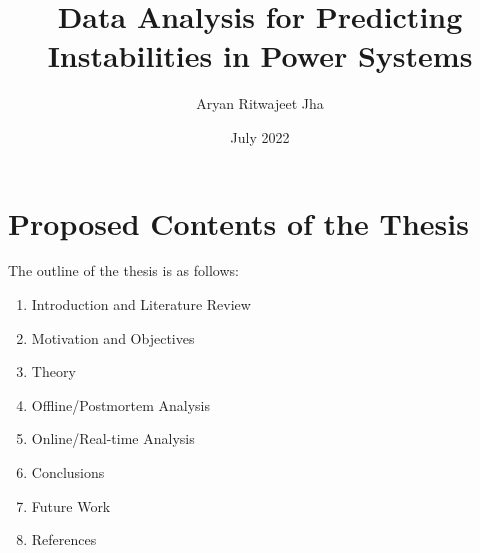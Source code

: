 \documentclass[MS,synopsis]{iitddiss}
\title{Data Analysis for Predicting Instabilities in Power Systems}
\author{Aryan Ritwajeet Jha}
\date{July 2022}
\begin{document}
\maketitle

\setcounter{page}{0}

\newpage

\tableofcontents



















\section{Proposed Contents of the Thesis}
The outline of the thesis is as follows:
\begin{enumerate}
\item Introduction and Literature Review
\item Motivation and Objectives
\item Theory
\item Offline/Postmortem Analysis
\item Online/Real-time Analysis
\item Conclusions
\item Future Work
\item References
\end{enumerate}
\end{document}

